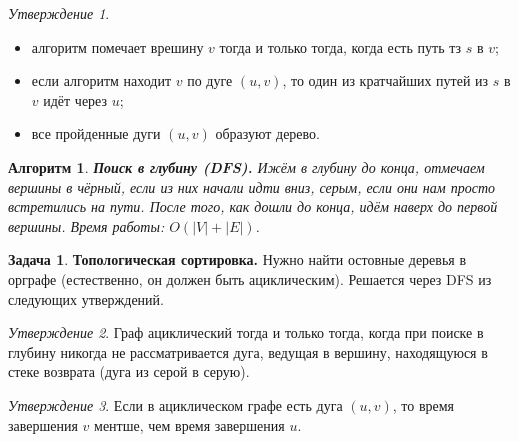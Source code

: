 \documentclass[a4paper]{article}
\theoremstyle{indented}
\newtheorem{alg}{Алгоритм}
\theoremstyle{definition}
\newtheorem{prob}{Задача}
\theoremstyle{remark}
\newtheorem{stat}{Утверждение}
\begin{document}
\begin{stat} \ 
    \begin{itemize}
        \item алгоритм помечает врешину $v$ тогда и только тогда, когда есть путь тз $s$ в $v$; 
        \item если алгоритм находит $v$ по дуге $(u, v)$, то один из кратчайших путей из $s$ в $v$ идёт через $u$; 
        \item все пройденные дуги $(u, v)$ образуют дерево.
    \end{itemize}
\end{stat}

\begin{alg}
    \textbf{Поиск в глубину (DFS).} Ижём в глубину до конца, отмечаем вершины в чёрный, если из них начали идти вниз, серым, если они нам просто встретились на пути. После того, как дошли до конца, идём наверх до первой вершины. Время работы: $O(|V|+|E|)$. 
\end{alg}

\begin{prob}
    \textbf{Топологическая сортировка.} Нужно найти остовные деревья в орграфе (естественно, он должен быть ациклическим). Решается через DFS из следующих утверждений. 
\end{prob}

\begin{stat}
    Граф ациклический тогда и только тогда, когда при поиске в глубину никогда не рассматривается дуга, ведущая в вершину, находящуюся в стеке возврата (дуга из серой в серую).
\end{stat}

\begin{stat}
    Если в ациклическом графе есть дуга $(u, v)$, то время завершения $v$ ментше, чем время завершения $u$. 
\end{stat}
\end{document}
